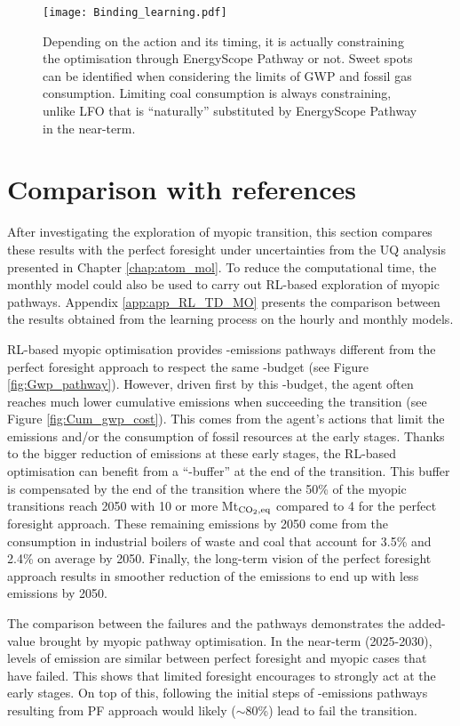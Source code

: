 \begin{figure}[!htbp]
\centering
\texttt{[image: Binding\_learning.pdf]}
\caption{Depending on the action and its timing, it is actually constraining the optimisation through EnergyScope Pathway or not. Sweet spots can be identified when considering the limits of \gls{GWP} and fossil gas consumption. Limiting coal consumption is always constraining, unlike \gls{LFO} that is ``naturally'' substituted by EnergyScope Pathway in the near-term.}
\label{fig:Binding_learning}
\end{figure}

\section{Comparison with references}
\label{sec:RL:testing}
After investigating the exploration of myopic transition, this section compares these results with the perfect foresight under uncertainties from the \gls{UQ} analysis presented in Chapter \ref{chap:atom_mol}. To reduce the computational time, the monthly model could also be used to carry out \gls{RL}-based exploration of myopic pathways. Appendix \ref{app:app_RL_TD_MO} presents the comparison between the results obtained from the learning process on the hourly and monthly models.

\gls{RL}-based myopic optimisation provides -emissions pathways different from the perfect foresight approach to respect the same -budget (see Figure \ref{fig:Gwp_pathway}). However, driven first by this -budget, the agent often reaches much lower cumulative emissions when succeeding the transition (see Figure \ref{fig:Cum_gwp_cost}). This comes from the agent's actions that limit the emissions and/or the consumption of fossil resources at the early stages. Thanks to the bigger reduction of emissions at these early stages, the \gls{RL}-based optimisation can benefit from a ``-buffer'' at the end of the transition. This buffer is compensated by the end of the transition where the 50\% of the myopic transitions reach 2050 with 10 or more Mt$_{\ce{CO2},\text{eq}}$ compared to 4 for the perfect foresight approach. These remaining emissions by 2050 come from the consumption in industrial boilers of waste and coal that account for 3.5\% and 2.4\% on average by 2050. Finally, the long-term vision of the perfect foresight approach results in smoother reduction of the emissions to end up with less emissions by 2050.

The comparison between the failures and the pathways demonstrates the added-value brought by myopic pathway optimisation. In the near-term (2025-2030), levels of emission are similar between perfect foresight and myopic cases that have failed. This shows that limited foresight encourages to strongly act at the early stages. On top of this, following the initial steps of -emissions pathways resulting from PF approach would likely ($\sim$80\%) lead to fail the transition. 


